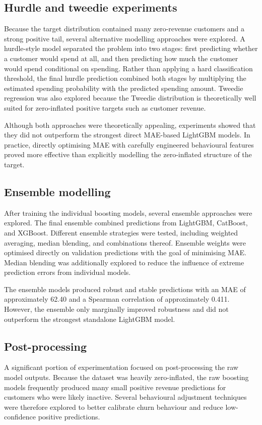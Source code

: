 \subsection{Hurdle and tweedie experiments}
Because the target distribution contained many zero-revenue customers and a strong positive tail, several alternative modelling approaches were explored. A hurdle-style model separated the problem into two stages: first predicting whether a customer would spend at all, and then predicting how much the customer would spend conditional on spending. Rather than applying a hard classification threshold, the final hurdle prediction combined both stages by multiplying the estimated spending probability with the predicted spending amount. Tweedie regression was also explored because the Tweedie distribution is theoretically well suited for zero-inflated positive targets such as customer revenue.

Although both approaches were theoretically appealing, experiments showed that they did not outperform the strongest direct MAE-based LightGBM models. In practice, directly optimising MAE with carefully engineered behavioural features proved more effective than explicitly modelling the zero-inflated structure of the target.

\subsection{Ensemble modelling}
After training the individual boosting models, several ensemble approaches were explored. The final ensemble combined predictions from LightGBM, CatBoost, and XGBoost. Different ensemble strategies were tested, including weighted averaging, median blending, and combinations thereof. Ensemble weights were optimised directly on validation predictions with the goal of minimising MAE. Median blending was additionally explored to reduce the influence of extreme prediction errors from individual models.

The ensemble models produced robust and stable predictions with an MAE of approximately 62.40 and a Spearman correlation of approximately 0.411. However, the ensemble only marginally improved robustness and did not outperform the strongest standalone LightGBM model.

\subsection{Post-processing}
A significant portion of experimentation focused on post-processing the raw model outputs. Because the dataset was heavily zero-inflated, the raw boosting models frequently produced many small positive revenue predictions for customers who were likely inactive. Several behavioural adjustment techniques were therefore explored to better calibrate churn behaviour and reduce low-confidence positive predictions.

